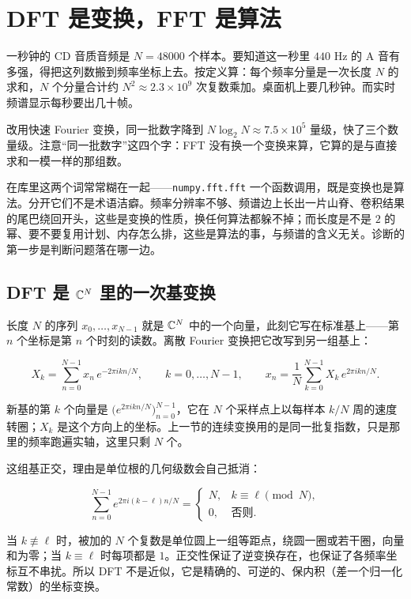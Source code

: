 \section{DFT 是变换，FFT 是算法}
\label{sec:08-Numerical-Analysis/08-Fourier-and-Spectral-Methods/03}

一秒钟的 CD 音质音频是 \(N=48000\) 个样本。要知道这一秒里 \(440\) Hz 的 A 音有多强，得把这列数搬到频率坐标上去。按定义算：每个频率分量是一次长度 \(N\) 的求和，\(N\) 个分量合计约 \(N^2\approx2.3\times10^9\) 次复数乘加。桌面机上要几秒钟。而实时频谱显示每秒要出几十帧。

改用快速 Fourier 变换，同一批数字降到 \(N\log_2N\approx7.5\times10^5\) 量级，快了三个数量级。注意``同一批数字''这四个字：FFT 没有换一个变换来算，它算的是与直接求和一模一样的那组数。

在库里这两个词常常糊在一起——\texttt{numpy.fft.fft} 一个函数调用，既是变换也是算法。分开它们不是术语洁癖。频率分辨率不够、频谱边上长出一片山脊、卷积结果的尾巴绕回开头，这些是变换的性质，换任何算法都躲不掉；而长度是不是 \(2\) 的幂、要不要复用计划、内存怎么排，这些是算法的事，与频谱的含义无关。诊断的第一步是判断问题落在哪一边。

\subsection{DFT 是 \(\mathbb{C}^N\) 里的一次基变换}

长度 \(N\) 的序列 \(x_0,\dots,x_{N-1}\) 就是 \(\mathbb{C}^N\) 中的一个向量，此刻它写在标准基上——第 \(n\) 个坐标是第 \(n\) 个时刻的读数。离散 Fourier 变换把它改写到另一组基上：

\[
X_k=\sum_{n=0}^{N-1}x_n\,e^{-2\pi ikn/N},\qquad k=0,\dots,N-1,
\qquad
x_n=\frac1N\sum_{k=0}^{N-1}X_k\,e^{2\pi ikn/N}.
\]

新基的第 \(k\) 个向量是 \(\bigl(e^{2\pi ikn/N}\bigr)_{n=0}^{N-1}\)，它在 \(N\) 个采样点上以每样本 \(k/N\) 周的速度转圈；\(X_k\) 是这个方向上的坐标。上一节的连续变换用的是同一批复指数，只是那里的频率跑遍实轴，这里只剩 \(N\) 个。

这组基正交，理由是单位根的几何级数会自己抵消：

\[
\sum_{n=0}^{N-1}e^{2\pi i(k-\ell)n/N}
=\begin{cases}N,&k\equiv\ell\pmod N,\\[2pt] 0,&\text{否则}.\end{cases}
\]

当 \(k\not\equiv\ell\) 时，被加的 \(N\) 个复数是单位圆上一组等距点，绕圆一圈或若干圈，向量和为零；当 \(k\equiv\ell\) 时每项都是 \(1\)。正交性保证了逆变换存在，也保证了各频率坐标互不串扰。所以 DFT 不是近似，它是精确的、可逆的、保内积（差一个归一化常数）的坐标变换。

